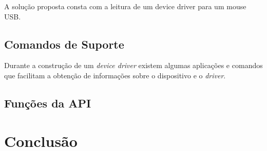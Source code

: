 A solução proposta consta com a leitura de um device driver para um mouse USB.

\subsection{Comandos de Suporte}
\label{util}
Durante a construção de um \textit{device driver} existem algumas aplicações e comandos que facilitam
a obtenção de informações sobre o dispositivo e o \textit{driver}.



\subsection{Funções da API}



\section{Conclusão}


